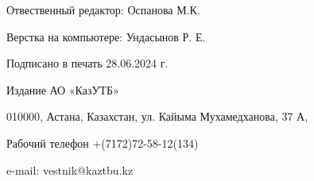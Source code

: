 \newpage

\thispagestyle{empty}
\null
\vfill
\begin{center}
Отвественный редактор: Оспанова М.К.

Верстка на компьютере: Ундасынов Р. Е.

Подписано в печать 28.06.2024 г.

Издание АО «КазУТБ»

010000, Астана, Казахстан, ул. Кайыма Мухамедханова, 37 А,

Рабочий телефон +(7172)72-58-12(134)

e-mail: vestnik@kaztbu.kz
\end{center}
\vfill
\null
